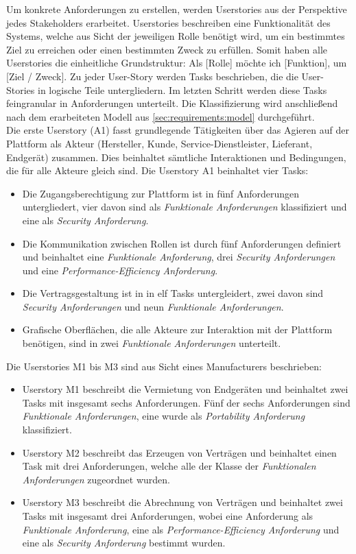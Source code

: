 Um konkrete Anforderungen zu erstellen, werden Userstories aus der Perspektive jedes Stakeholders erarbeitet. Userstories beschreiben eine Funktionalität des Systems, welche aus Sicht der jeweiligen Rolle benötigt wird, um ein bestimmtes Ziel zu erreichen oder einen bestimmten Zweck zu erfüllen. Somit haben alle Userstories die einheitliche Grundstruktur: \glqq Als [Rolle] möchte ich [Funktion], um [Ziel / Zweck]. \grqq Zu jeder User-Story werden Tasks beschrieben, die die User-Stories in logische Teile untergliedern. Im letzten Schritt werden diese Tasks feingranular in Anforderungen unterteilt. Die Klassifizierung wird anschließend nach dem erarbeiteten Modell aus \ref{sec:requirements:model} durchgeführt.\\

Die erste Userstory (A1) fasst grundlegende Tätigkeiten über das Agieren auf der Plattform als Akteur (Hersteller, Kunde, Service-Dienstleister, Lieferant, Endgerät) zusammen. Dies beinhaltet sämtliche Interaktionen und Bedingungen, die für alle Akteure gleich sind. Die Userstory A1 beinhaltet vier Tasks:
\begin{itemize}
  \item Die Zugangsberechtigung zur Plattform ist in fünf Anforderungen untergliedert, vier davon sind als \textit{Funktionale Anforderungen} klassifiziert und eine als \textit{Security Anforderung}.
  \item Die Kommunikation zwischen Rollen ist durch fünf Anforderungen definiert und beinhaltet eine \textit{Funktionale Anforderung}, drei \textit{Security Anforderungen} und eine \textit{Performance-Efficiency Anforderung}.
  \item Die Vertragsgestaltung ist in in elf Tasks untergleidert, zwei davon sind \textit{Security Anforderungen} und neun \textit{Funktionale Anforderungen}.
  \item Grafische Oberflächen, die alle Akteure zur Interaktion mit der Plattform benötigen, sind in zwei \textit{Funktionale Anforderungen} unterteilt.
\end{itemize}

Die Userstories M1 bis M3 sind aus Sicht eines Manufacturers beschrieben:
\begin{itemize}
  \item Userstory M1 beschreibt die Vermietung von Endgeräten und beinhaltet zwei Tasks mit insgesamt sechs Anforderungen. Fünf der sechs Anforderungen sind \textit{Funktionale Anforderungen}, eine wurde als \textit{Portability Anforderung} klassifiziert.
  \item Userstory M2 beschreibt das Erzeugen von Verträgen und beinhaltet einen Task mit drei Anforderungen, welche alle der Klasse der \textit{Funktionalen Anforderungen} zugeordnet wurden.
  \item Userstory M3 beschreibt die Abrechnung von Verträgen und beinhaltet zwei Tasks mit insgesamt drei Anforderungen, wobei eine Anforderung als \textit{Funktionale Anforderung}, eine als \textit{Performance-Efficiency Anforderung} und eine als \textit{Security Anforderung} bestimmt wurden.
\end{itemize}

